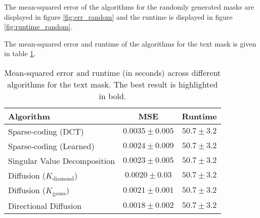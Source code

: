 The mean-squared error of the algorithms for the randomly generated masks are displayed in figure \ref{fig:err_random} and the runtime is displayed in figure \ref{fig:runtime_random}.

The mean-squared error and runtime of the algorithms for the text mask is given in table \ref{tbl:err_text}.



\begin{table}
	\centering
	\begin{tabular}{|l|c|c|}
		\hline
		\textbf{Algorithm} & \textbf{MSE} & \textbf{Runtime} \\ \hline \hline
		Sparse-coding (DCT) & $0.0035 \pm 0.005$ & $50.7 \pm 3.2$ \\ \hline
		Sparse-coding (Learned) & $0.0024 \pm 0.009$ & $50.7 \pm 3.2$ \\ \hline
		Singular Value Decomposition & $0.0023 \pm 0.005$ & $50.7 \pm 3.2$ \\ \hline
		Diffusion ($K_{\text{diamond}}$) & $0.0020 \pm 0.03$ & $50.7 \pm 3.2$ \\ \hline
		Diffusion ($K_{\text{gauss}}$) & $0.0021 \pm 0.001$ & $50.7 \pm 3.2$ \\ \hline
		Directional Diffusion & $\mathbf{0.0018} \pm 0.002$ & $50.7 \pm 3.2$ \\ \hline
	\end{tabular}
	\caption{Mean-squared error and runtime (in seconds) across different algorithms for the text mask. The best result is highlighted in bold.}
	\label{tbl:err_text}
\end{table}

